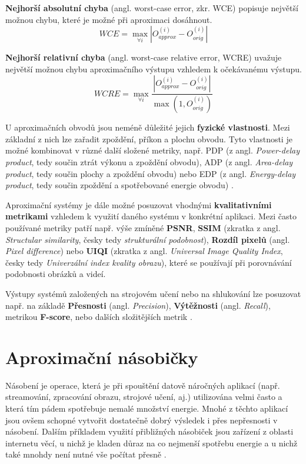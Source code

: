 \textbf{Nejhorší absolutní chyba} (angl. worst-case error, zkr. WCE) popisuje největší možnou chybu, které je možné při aproximaci dosáhnout.
\begin{equation}
    WCE = \max_{\forall i} \left|{O_{approx}^{(i)} - O_{orig}^{(i)}}\right|
\end{equation}

\textbf{Nejhorší relativní chyba} (angl. worst-case relative error, WCRE) uvažuje největší možnou chybu aproximačního výstupu vzhledem k očekávanému výstupu.
\begin{equation}
    WCRE = \max_{\forall i} \frac{\left|{O_{approx}^{(i)} - O_{orig}^{(i)}}\right|} {\max(1,O_{orig}^{(i)})} 
\end{equation}

\bigskip

U aproximačních obvodů jsou neméně důležité jejich \textbf{fyzické vlastnosti}. Mezi základní z nich lze zařadit zpoždění, příkon a plochu obvodu. Tyto vlastnosti je možné kombinovat v různé další složené metriky, např. PDP (z angl. \textit{Power-delay product}, tedy součin ztrát výkonu a zpoždění obvodu), ADP (z angl. \textit{Area-delay product}, tedy součin plochy a zpoždění obvodu) nebo EDP (z angl. \textit{Energy-delay product}, tedy součin zpoždění a spotřebované energie obvodu) \cite{approx_arith_circuits}.

\bigskip

Aproximační systémy je dále možné posuzovat vhodnými \textbf{kvalitativními metrikami} vzhledem k využití daného systému v konkrétní aplikaci. Mezi často používané metriky \cite{ac_techniques} patří např. výše zmíněné \textbf{PSNR}, \textbf{SSIM} (zkratka z angl. \textit{Structular similarity}, česky tedy \textit{strukturální podobnost}), \textbf{Rozdíl pixelů} (angl. \textit{Pixel difference}) nebo \textbf{UIQI} (zkratka z angl. \textit{Universal Image Quality Index}, česky tedy \textit{Univerzální index kvality obrazu}), které se používají při porovnávání podobnosti obrázků a videí.

Výstupy systémů založených na strojovém učení nebo na shlukování lze posuzovat např. na základě \textbf{Přesnosti} (angl. \textit{Precision}), \textbf{Výtěžnosti} (angl. \textit{Recall}), metrikou \textbf{F-score}, nebo dalších složitějších metrik \cite{clustering_eval}.

\section{Aproximační násobičky} \label{approx_mult}
Násobení je operace, která je při spouštění datově náročných aplikací (např. streamování, zpracování obrazu, strojové učení, aj.) utilizována velmi často a která tím pádem spotřebuje nemalé množství energie. Mnohé z těchto aplikací jsou ovšem schopné vytvořit dostatečně dobrý výsledek i přes nepřesnosti v násobení. Dalším příkladem využití přibližných násobiček jsou zařízení z oblasti internetu věcí, u nichž je kladen důraz na co nejmenší spotřebu energie a u nichž také mnohdy není nutné vše počítat přesně \cite{approx_mult_survey}. 

